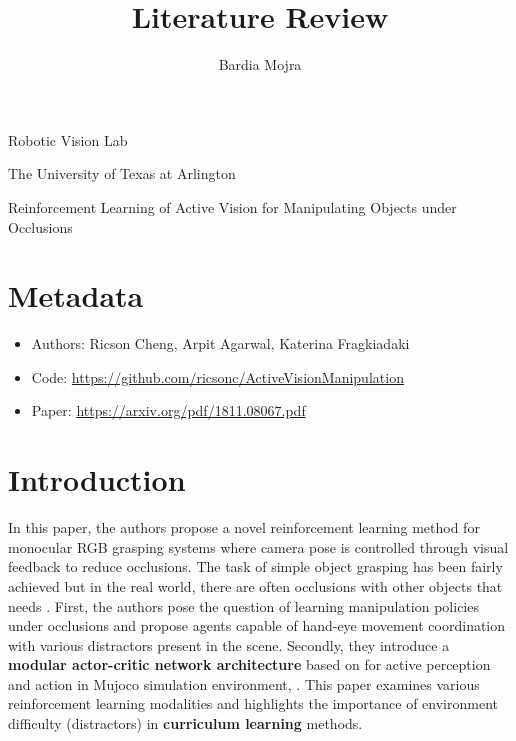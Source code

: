 \documentclass[11pt]{article}
\title{Literature Review}
\author{Bardia Mojra}
\begin{document}
\maketitle
\thispagestyle{empty}
\begin{center}
      Robotic Vision Lab
\end{center}

\begin{center}
      The University of Texas at Arlington
\end{center}
\bigskip
\bigskip
\begin{center}
{\Large Reinforcement Learning of Active Vision for Manipulating Objects under
Occlusions}
\end{center}

\section{Metadata}
\begin{itemize}
      \item Authors: Ricson Cheng, Arpit Agarwal, Katerina Fragkiadaki
      \item Code: \url{https://github.com/ricsonc/ActiveVisionManipulation}
      \item Paper: \url{https://arxiv.org/pdf/1811.08067.pdf}
\end{itemize}

\section{Introduction}
\par In this paper, the authors propose a novel reinforcement learning method
for monocular RGB grasping systems where camera pose is controlled through
visual feedback to reduce occlusions. The task of simple object grasping has been fairly achieved
but in the real world, there are often occlusions with other objects that needs .
First, the authors pose the question of learning manipulation policies under
occlusions and propose agents capable of hand-eye movement coordination with
various distractors present in the scene. Secondly, they introduce a \textbf{modular
actor-critic network architecture} based on \cite{andrychowicz2017hindsight}
for active perception and action in Mujoco simulation environment, \cite{todorov2012mujoco}.
This paper examines various reinforcement learning modalities and highlights the
importance of environment difficulty (distractors) in \textbf{curriculum learning}
methods.
\end{document}
